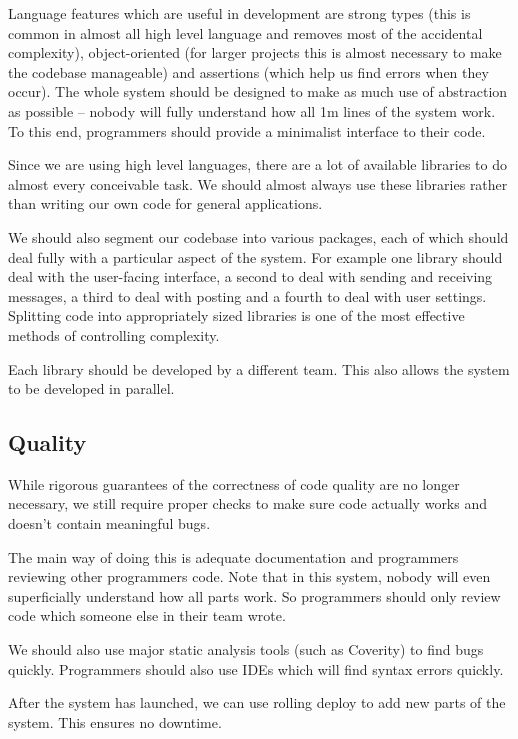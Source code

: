\documentclass[10pt,\jkfside,a4paper]{article}
\begin{document}
\begin{enumerate}
\begin{enumerate}[label=(\alph*)]
Language features which are useful in development are strong types (this is common in almost all high level language
and removes most of the accidental complexity), object-oriented (for larger projects this is almost necessary to make
the codebase manageable) and assertions (which help us find errors when they occur). The whole system should be
designed to make as much use of abstraction as possible -- nobody will fully understand how all 1m lines of the
system work. To this end, programmers should provide a minimalist interface to their code.

Since we are using high level languages, there are a lot of available libraries to do almost every conceivable task.
We should almost always use these libraries rather than writing our own code for general applications.

We should also segment our codebase into various packages, each of which should deal fully with a particular aspect
of the system. For example one library should deal with the user-facing interface, a second to deal with sending and
receiving messages, a third to deal with posting and a fourth to deal with user settings. Splitting code into
appropriately sized libraries is one of the most effective methods of controlling complexity.

Each library should be developed by a different team. This also allows the system to be developed in parallel.

\subsection*{Quality}

While rigorous guarantees of the correctness of code quality are no longer necessary, we still require proper checks
to make sure code actually works and doesn't contain meaningful bugs.

The main way of doing this is adequate documentation and programmers reviewing other programmers code. Note that in
this system, nobody will even superficially understand how all parts work. So programmers should only review code which
someone else in their team wrote.

We should also use major static analysis tools (such as Coverity) to find bugs quickly. Programmers should also use
IDEs which will find syntax errors quickly.

After the system has launched, we can use rolling deploy to add new parts of the system. This ensures no downtime.


\end{enumerate}
\end{enumerate}
\end{document}

